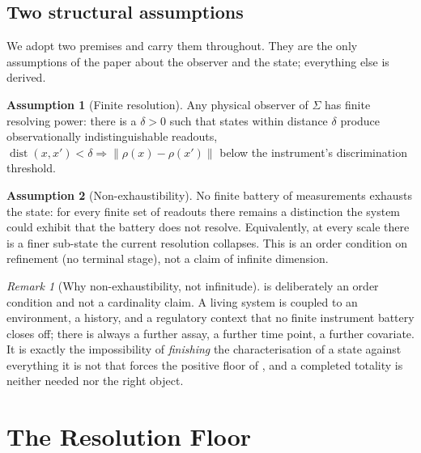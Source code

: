 \documentclass[11pt,a4paper]{article}
\theoremstyle{cfcthm}
\theoremstyle{definition}
\newtheorem{assumption}{Assumption}
\theoremstyle{remark}
\newtheorem{remark}[theorem]{Remark}
\newcommand{\st}{x}                     %
\newcommand{\Rd}{\rho}                  %
\newcommand{\norm}[1]{\lVert#1\rVert}
\newcommand{\dist}{\operatorname{dist}}
\begin{document}
\subsection{Two structural assumptions}

We adopt two premises and carry them throughout. They are the only assumptions
of the paper about the observer and the state; everything else is derived.

\begin{assumption}[Finite resolution]
\label{ass:finite}
Any physical observer of $\Sigma$ has finite resolving power: there is a
$\delta>0$ such that states within distance $\delta$ produce observationally
indistinguishable readouts,
$\dist(\st,\st')<\delta\Rightarrow\norm{\Rd(\st)-\Rd(\st')}$ below the
instrument's discrimination threshold.
\end{assumption}

\begin{assumption}[Non-exhaustibility]
\label{ass:nonexhaust}
No finite battery of measurements exhausts the state: for every finite set of
readouts there remains a distinction the system could exhibit that the battery
does not resolve. Equivalently, at every scale there is a finer sub-state the
current resolution collapses. This is an order condition on refinement (no
terminal stage), not a claim of infinite dimension.
\end{assumption}

\begin{remark}[Why non-exhaustibility, not infinitude]
\label{rem:why-nonexhaust}
 is deliberately an order condition and not a cardinality
claim. A living system is coupled to an environment, a history, and a
regulatory context that no finite instrument battery closes off; there is
always a further assay, a further time point, a further covariate. It is
exactly the impossibility of \emph{finishing} the characterisation of a state
against everything it is not that forces the positive floor of ,
and a completed totality is neither needed nor the right object.
\end{remark}

\section{The Resolution Floor}
\label{sec:floor}
\end{document}
